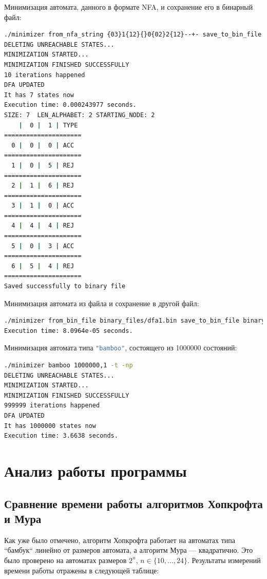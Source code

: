 \documentclass{article}
\begin{document}
Минимизация автомата, данного в формате NFA, и сохранение его в бинарный файл:
\begin{lstlisting}[language=bash]
./minimizer from_nfa_string {03}1{12}{}0{02}2{12}--+- save_to_bin_file binary_files/dfa0.bin -t
DELETING UNREACHABLE STATES...
MINIMIZATION STARTED...
MINIMIZATION FINISHED SUCCESSFULLY
10 iterations happened
DFA UPDATED
It has 7 states now
Execution time: 0.000243977 seconds.
SIZE: 7  LEN_ALPHABET: 2 STARTING_NODE: 2
    |  0 |  1 | TYPE 
=====================
  0 |  0 |  0 | ACC
=====================
  1 |  0 |  5 | REJ
=====================
  2 |  1 |  6 | REJ
=====================
  3 |  1 |  0 | ACC
=====================
  4 |  4 |  4 | REJ
=====================
  5 |  0 |  3 | ACC
=====================
  6 |  5 |  4 | REJ
=====================
Saved successfully to binary file
\end{lstlisting}
Минимизация автомата из файла и сохранение в другой файл:
\begin{lstlisting}[language=bash]
./minimizer from_bin_file binary_files/dfa1.bin save_to_bin_file binary_files/dfa2.bin -t -np -nd
Execution time: 8.0964e-05 seconds.
\end{lstlisting}
Минимизация автомата типа \lstinline[language=bash]!"bamboo"!, состоящего из 1000000 состояний:
\begin{lstlisting}[language=bash]
./minimizer bamboo 1000000,1 -t -np
DELETING UNREACHABLE STATES...
MINIMIZATION STARTED...
MINIMIZATION FINISHED SUCCESSFULLY
999999 iterations happened
DFA UPDATED
It has 1000000 states now
Execution time: 3.6638 seconds.
\end{lstlisting}

\section{Анализ работы программы}

\subsection{Сравнение времени работы алгоритмов Хопкрофта и Мура}

Как уже было отмечено, алгоритм Хопкрофта работает на автоматах типа ``бамбук`` линейно от размеров автомата, а алгоритм Мура --- квадратично. Это было проверено на автоматах размеров $2^n$, $n \in \{10, \dots, 24\}$. Результаты измерений времени работы отражены в следующей таблице:
\end{document}
